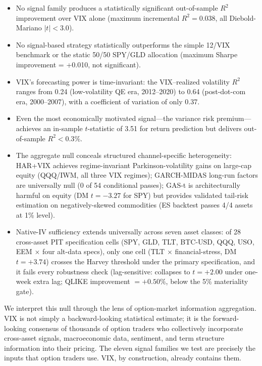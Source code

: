 \documentclass[12pt,a4paper]{article}
\begin{document}
\begin{itemize}
    \item No signal family produces a statistically significant out-of-sample $R^2$ improvement over VIX alone (maximum incremental $R^2 = 0.038$, all Diebold-Mariano $|t| < 3.0$).
    \item No signal-based strategy statistically outperforms the simple 12/VIX benchmark or the static 50/50 SPY/GLD allocation (maximum Sharpe improvement = +0.010, not significant).
    \item VIX's forecasting power is time-invariant: the VIX--realized volatility $R^2$ ranges from 0.24 (low-volatility QE era, 2012--2020) to 0.64 (post-dot-com era, 2000--2007), with a coefficient of variation of only 0.37.
    \item Even the most economically motivated signal---the variance risk premium---achieves an in-sample $t$-statistic of 3.51 for return prediction but delivers out-of-sample $R^2 < 0.3\%$.
    \item The aggregate null conceals structured channel-specific heterogeneity: HAR+VIX achieves regime-invariant Parkinson-volatility gains on large-cap equity (QQQ/IWM, all three VIX regimes); GARCH-MIDAS long-run factors are universally null (0 of 54 conditional passes); GAS-t is architecturally harmful on equity (DM $t = -3.27$ for SPY) but provides validated tail-risk estimation on negatively-skewed commodities (ES backtest passes 4/4 assets at 1\% level).
    \item Native-IV sufficiency extends universally across seven asset classes: of 28 cross-asset PIT specification cells (SPY, GLD, TLT, BTC-USD, QQQ, USO, EEM $\times$ four alt-data specs), only one cell (TLT $\times$ financial-stress, DM $t = +3.74$) crosses the Harvey threshold under the primary specification, and it fails every robustness check (lag-sensitive: collapses to $t = +2.00$ under one-week extra lag; QLIKE improvement $= +0.50\%$, below the 5\% materiality gate).
\end{itemize}

We interpret this null through the lens of option-market information aggregation. VIX is not simply a backward-looking statistical estimate; it is the forward-looking consensus of thousands of option traders who collectively incorporate cross-asset signals, macroeconomic data, sentiment, and term structure information into their pricing. The eleven signal families we test are precisely the inputs that option traders use. VIX, by construction, already contains them.
\end{document}

